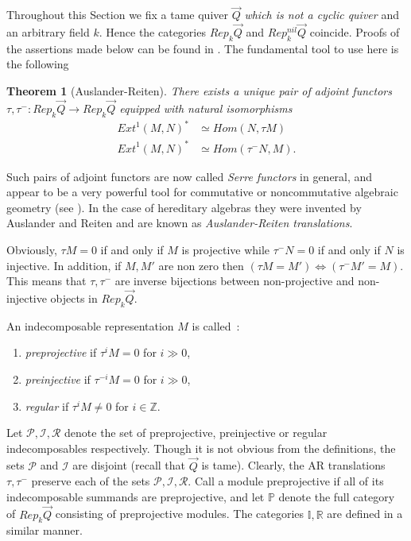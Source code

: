 \documentclass[a4paper,10pt]{amsart}
\def\Z{\mathbb{Z}}
\newtheorem{theo}{\bf{Theorem}}[section]
\numberwithin{equation}{section}
\begin{document}
Throughout this Section we fix a tame quiver $\vec{Q}$ \textit{which is not a cyclic quiver} and an arbitrary field $k$. Hence the categories $Rep_k \vec{Q}$ and $Rep^{nil}_k\vec{Q}$ coincide. Proofs of the assertions made below can be found in \cite{CrawleyNotes}. The fundamental tool to use here is the following

\vspace{.1in}

\begin{theo}[Auslander-Reiten] There exists a unique pair of adjoint functors $\tau,\tau^-: Rep_k\vec{Q} \to Rep_k\vec{Q}$ equipped with natural isomorphisms
\begin{align*}
{Ext}^1(M,N)^* &\simeq {Hom}(N,\tau M)\\
{Ext}^1(M,N)^* &\simeq {Hom}(\tau^-N, M).
\end{align*}
\end{theo}

\vspace{.1in}

Such pairs of adjoint functors are now called \textit{Serre functors} in general, and appear to be a very powerful tool for commutative or noncommutative algebraic geometry (see \cite{VandenBergh}). In the case of hereditary algebras they were invented by Auslander and Reiten and are known as \textit{Auslander-Reiten translations}.

\vspace{.15in}

Obviously, $\tau M=0$ if and only if  $M$ is projective while $\tau^{-} N=0$ if and only if $N$ is injective. In addition, if $M,M'$ are non zero then $(\tau M=M') \Leftrightarrow (\tau^- M'=M)$. This means that
$\tau,\tau^-$ are inverse bijections between non-projective and non-injective objects in $Rep_k\vec{Q}$.

\vspace{.1in}

An indecomposable representation $M$ is called~:
\begin{enumerate}
\item[-] \textit{preprojective} if $\tau^i M =0$ for $i \gg 0$,
\item[-] \textit{preinjective} if $\tau^{-i} M =0$ for $i \gg 0$,
\item[-] \textit{regular} if $\tau^i M \neq 0$ for $i \in \Z$.
\end{enumerate}

Let $\mathcal{P}, \mathcal{I}, \mathcal{R}$ denote the set of preprojective, preinjective or regular indecomposables respectively. Though it is not obvious from the definitions, the sets $\mathcal{P}$ and $\mathcal{I}$ are disjoint (recall that $\vec{Q}$ is tame). Clearly, the AR translations $\tau,\tau^-$ preserve each of the sets $\mathcal{P},\mathcal{I},\mathcal{R}$. Call a module preprojective if all of its indecomposable summands are preprojective, and let $\mathbb{P}$ denote the full category of $Rep_k\vec{Q}$ consisting of preprojective modules. The categories $\mathbb{I},\mathbb{R}$ are defined in a similar manner.
\end{document}
